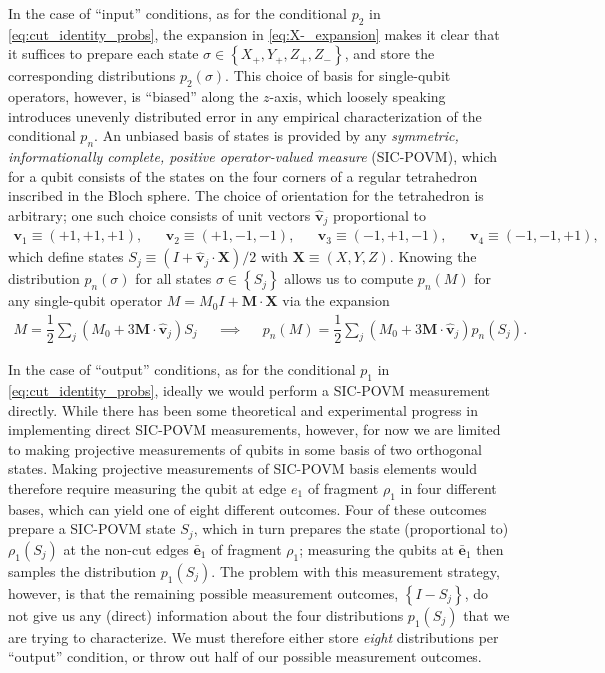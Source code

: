 \documentclass[nofootinbib,notitlepage,11pt]{revtex4-2}
\newcommand{\f}[2]{\dfrac{#1}{#2}} %
\newcommand{\p}[1]{\left(#1\right)} %
\renewcommand{\set}[1]{\left\{#1\right\}} %
\renewcommand{\v}{\bm} %
\newcommand{\uv}[1]{\bm{\hat{#1}}} %
\renewcommand{\c}{\cdot} %
\begin{document}
In the case of ``input'' conditions, as for the conditional $p_2$ in
\eqref{eq:cut_identity_probs}, the expansion in
\eqref{eq:X-_expansion} makes it clear that it suffices to prepare
each state $\sigma \in \set{X_+,Y_+,Z_+,Z_-}$, and store the
corresponding distributions $p_2\p{\sigma}$.  This choice of basis for
single-qubit operators, however, is ``biased'' along the $z$-axis,
which loosely speaking introduces unevenly distributed error in any
empirical characterization of the conditional $p_n$.  An unbiased
basis of states is provided by any {\it symmetric, informationally
  complete, positive operator-valued measure} (SIC-POVM), which for a
qubit consists of the states on the four corners of a regular
tetrahedron inscribed in the Bloch sphere.  The choice of orientation
for the tetrahedron is arbitrary; one such choice consists of unit
vectors $\uv v_j$ proportional to
\begin{align}
  \v v_1 \equiv \p{ +1, +1, +1 }, &&
  \v v_2 \equiv \p{ +1, -1, -1 }, &&
  \v v_3 \equiv \p{ -1, +1, -1 }, &&
  \v v_4 \equiv \p{ -1, -1, +1 },
\end{align}
which define states $S_j\equiv\p{I+\uv v_j\c\v X}/2$ with
$\v X\equiv\p{X,Y,Z}$.  Knowing the distribution $p_n\p{\sigma}$ for
all states $\sigma\in\set{S_j}$ allows us to compute $p_n\p{M}$ for
any single-qubit operator $M=M_0I+\v M\c\v X$ via the expansion
\begin{align}
  M = \f12 \sum_j \p{ M_0 + 3 \v M\c\uv v_j } S_j
  &&
  \implies
  &&
  p_n\p{M} = \f12 \sum_j \p{ M_0 + 3 \v M\c\uv v_j } p_n\p{S_j}.
  \label{eq:SIC_expansion}
\end{align}

In the case of ``output'' conditions, as for the conditional $p_1$ in
\eqref{eq:cut_identity_probs}, ideally we would perform a SIC-POVM
measurement directly.  While there has been some
theoretical\cite{tabia2012experimental} and
experimental\cite{bent2015experimental, bian2015realization} progress
in implementing direct SIC-POVM measurements, however, for now we are
limited to making projective measurements of qubits in some basis of
two orthogonal states.  Making projective measurements of SIC-POVM
basis elements would therefore require measuring the qubit at edge
$e_1$ of fragment $\rho_1$ in four different bases, which can yield
one of eight different outcomes.  Four of these outcomes prepare a
SIC-POVM state $S_j$, which in turn prepares the state (proportional
to) $\rho_1\p{S_j}$ at the non-cut edges $\bar{\v e}_1$ of fragment
$\rho_1$; measuring the qubits at $\bar{\v e}_1$ then samples the
distribution $p_1\p{S_j}$.  The problem with this measurement
strategy, however, is that the remaining possible measurement
outcomes, $\set{I-S_j}$, do not give us any (direct) information about
the four distributions $p_1\p{S_j}$ that we are trying to
characterize.  We must therefore either store {\it eight}
distributions per ``output'' condition, or throw out half of our
possible measurement outcomes.
\end{document}

